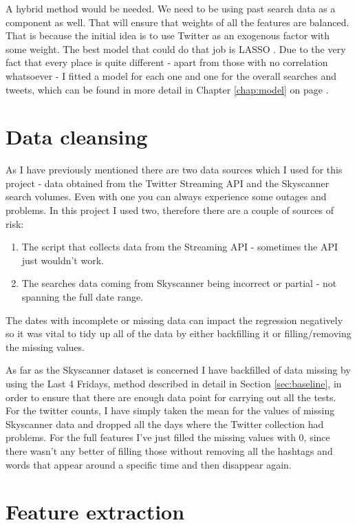 \documentclass[minf,twoside,singlespacing,parskip,frontabs,notimes,11pt]{infthesis}
\begin{document}
A hybrid method would be needed. We need to be using past search data as a component as well. That will ensure that weights of all the features are balanced. That is because the initial idea is to use Twitter as an exogenous factor with some weight. The best model that could do that job is LASSO \cite{lasso}. Due to the very fact that every place is quite different - apart from those with no correlation whatsoever - I fitted a model for each one and one for the overall searches and tweets, which can be found in more detail in Chapter \ref{chap:model} on page \pageref{chap:model}.


\section{Data cleansing}
\label{sec:cleansing}


As I have previously mentioned there are two data sources which I used for this project - data obtained from the Twitter Streaming API and the Skyscanner search volumes. Even with one you can always experience some outages and problems. In this project I used two, therefore there are a couple of sources of risk:
\begin{enumerate}
\item The script that collects data from the Streaming API - sometimes the API just wouldn't work. 
\item The searches data coming from Skyscanner being incorrect or partial - not spanning the full date range.
\end{enumerate}


The dates with incomplete or missing data can impact the regression negatively so it was vital to tidy up all of the data by either backfilling it or filling/removing the missing values. 

As far as the Skyscanner dataset is concerned I have backfilled of data missing by using the Last 4 Fridays, method described in detail in Section \ref{sec:baseline}, in order to ensure that there are enough data point for carrying out all the tests. For the twitter counts, I have simply taken the mean for the values of missing Skyscanner data and dropped all the days where the Twitter collection had problems. For the full features I've just filled the missing values with 0, since there wasn't any better of filling those without removing all the hashtags and words that appear around a specific time and then disappear again.


\section{Feature extraction}
\label{feat-extraction}
\end{document}
